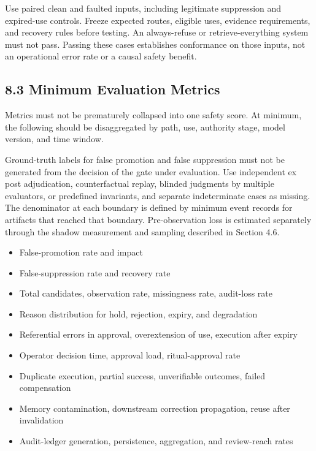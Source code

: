 Use paired clean and faulted inputs, including legitimate suppression and expired-use controls. Freeze expected routes, eligible uses, evidence requirements, and recovery rules before testing. An always-refuse or retrieve-everything system must not pass. Passing these cases establishes conformance on those inputs, not an operational error rate or a causal safety benefit.

\subsection{8.3 Minimum Evaluation Metrics}\label{minimum-evaluation-metrics}

Metrics must not be prematurely collapsed into one safety score. At minimum, the following should be disaggregated by path, use, authority stage, model version, and time window.

Ground-truth labels for false promotion and false suppression must not be generated from the decision of the gate under evaluation. Use independent ex post adjudication, counterfactual replay, blinded judgments by multiple evaluators, or predefined invariants, and separate indeterminate cases as missing. The denominator at each boundary is defined by minimum event records for artifacts that reached that boundary. Pre-observation loss is estimated separately through the shadow measurement and sampling described in Section 4.6.

\begin{itemize}
\tightlist
\item
  False-promotion rate and impact
\item
  False-suppression rate and recovery rate
\item
  Total candidates, observation rate, missingness rate, audit-loss rate
\item
  Reason distribution for hold, rejection, expiry, and degradation
\item
  Referential errors in approval, overextension of use, execution after expiry
\item
  Operator decision time, approval load, ritual-approval rate
\item
  Duplicate execution, partial success, unverifiable outcomes, failed compensation
\item
  Memory contamination, downstream correction propagation, reuse after invalidation
\item
  Audit-ledger generation, persistence, aggregation, and review-reach rates
\end{itemize}

